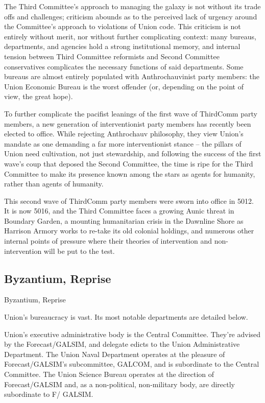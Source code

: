 The Third Committee’s approach to managing the galaxy is not without its trade offs and  
challenges; criticism abounds as to the perceived lack of urgency around the Committee’s  
approach to violations of Union code. This criticism is not entirely without merit, nor without further  
complicating context: many bureaus, departments, and agencies hold a strong institutional  
memory, and internal tension between Third Committee reformists and Second Committee  
conservatives complicates the necessary functions of said departments. Some bureaus are  
almost entirely populated with Anthrochauvinist party members: the Union Economic Bureau is  
the worst offender (or, depending on the point of view, the great hope).   

To further complicate the pacifist leanings of the first wave of ThirdComm party members, a new  
generation of interventionist party members has recently been elected to office. While rejecting  
Anthrochauv philosophy, they view Union’s mandate as one demanding a far more interventionist  
stance -- the pillars of Union need cultivation, not just stewardship, and following the success of  
the first wave’s coup that deposed the Second Committee, the time is ripe for the Third  
Committee to make its presence known among the stars as agents for humanity, rather than  
agents of humanity.   

This second wave of ThirdComm party members were sworn into office in 5012. It is now 5016,  
and the Third Committee faces a growing Aunic threat in Boundary Garden, a mounting  
humanitarian crisis in the Dawnline Shore as Harrison Armory works to re-take its old colonial  
holdings, and numerous other internal points of pressure where their theories of intervention and  
non-intervention will be put to the test.   

                                                                                                            

\subsection{Byzantium, Reprise }
   

Byzantium, Reprise  

Union’s bureaucracy is vast. Its most notable departments are detailed below. 
 

Union’s executive administrative body is the Central Committee. They’re advised by the  
Forecast/GALSIM, and delegate edicts to the Union Administrative Department. The Union Naval  
Department operates at the pleasure of Forecast/GALSIM’s subcommittee, GALCOM, and is  
subordinate to the Central Committee. The Union Science Bureau operates at the direction of  
Forecast/GALSIM and, as a non-political, non-military body, are directly subordinate to F/ 
GALSIM. 
 

